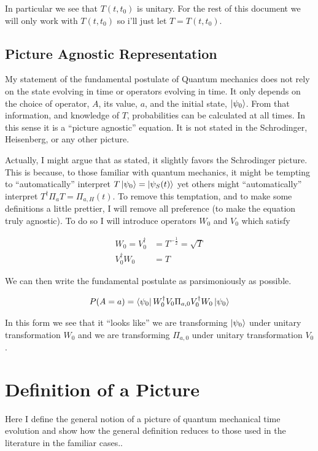 \documentclass[12pt]{article}
\begin{document}
In particular we see that $T(t,t_0)$ is unitary. For the rest of this document we will only work with $T(t,t_0)$ so i'll just let $T = T(t,t_0)$.

\subsection{Picture Agnostic Representation}

My statement of the fundamental postulate of Quantum mechanics does not rely on the state evolving in time or operators evolving in time. It only depends on the choice of operator, $A$, its value, $a$, and the initial state, $\ket{\psi_0}$. From that information, and knowledge of $T$, probabilities can be calculated at all times. In this sense it is a ``picture agnostic'' equation. It is not stated in the Schrodinger, Heisenberg, or any other picture.

Actually, I might argue that as stated, it slightly favors the Schrodinger picture. This is because, to those familiar with quantum mechanics, it might be tempting to ``automatically'' interpret $T \ket{\psi_0} = \ket{\psi_S(t)}$ yet others might ``automatically'' interpret $T^{\dag} \Pi_a T = \Pi_{a,H}(t)$. To remove this temptation, and to make some definitions a little prettier, I will remove all preference (to make the equation truly agnostic). To do so I will introduce operators $W_0$ and $V_0$ which satisfy

\begin{align}
W_0=V_0^{\dag} &= T^{-\frac{1}{2}} = \sqrt{T}\\
V_0^{\dag} W_0 &= T
\end{align}

We can then write the fundamental postulate as parsimoniously as possible.

\begin{align}
P(A=a) = \bra{\psi_0}W_0^{\dag}V_0 \Pi_{a,0} V_0^{\dag} W_0 \ket{\psi_0}
\end{align}

In this form we see that it ``looks like'' we are transforming $\ket{\psi_0}$ under unitary transformation $W_0$ and we are transforming $\Pi_{a,0}$ under unitary transformation $V_0$.

\section{Definition of a Picture}

Here I define the general notion of a picture of quantum mechanical time evolution and show how the general definition reduces to those used in the literature in the familiar cases..
\end{document}
